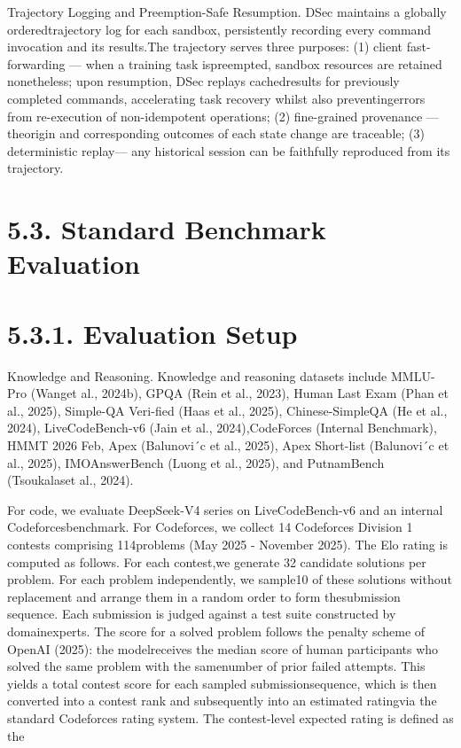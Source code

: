 \documentclass[
  10
]{article}
\newcounter{none} %
\begin{document}
Trajectory Logging and Preemption-Safe Resumption. DSec maintains a
globally orderedtrajectory log for each sandbox, persistently recording
every command invocation and its results.The trajectory serves three
purposes: (1) client fast-forwarding --- when a training task
ispreempted, sandbox resources are retained nonetheless; upon
resumption, DSec replays cachedresults for previously completed
commands, accelerating task recovery whilst also preventingerrors from
re-execution of non-idempotent operations; (2) fine-grained provenance
--- theorigin and corresponding outcomes of each state change are
traceable; (3) deterministic replay--- any historical session can be
faithfully reproduced from its trajectory.

\section{5.3. Standard Benchmark
Evaluation}\label{standard-benchmark-evaluation}

\section{5.3.1. Evaluation Setup}\label{evaluation-setup}

Knowledge and Reasoning. Knowledge and reasoning datasets include
MMLU-Pro (Wanget al., 2024b), GPQA (Rein et al., 2023), Human Last Exam
(Phan et al., 2025), Simple-QA Veri-fied (Haas et al., 2025),
Chinese-SimpleQA (He et al., 2024), LiveCodeBench-v6 (Jain et al.,
2024),CodeForces (Internal Benchmark), HMMT 2026 Feb, Apex (Balunovi´c
et al., 2025), Apex Short-list (Balunovi´c et al., 2025), IMOAnswerBench
(Luong et al., 2025), and PutnamBench (Tsoukalaset al., 2024).

For code, we evaluate DeepSeek-V4 series on LiveCodeBench-v6 and an
internal Codeforcesbenchmark. For Codeforces, we collect 14 Codeforces
Division 1 contests comprising 114problems (May 2025 - November 2025).
The Elo rating is computed as follows. For each contest,we generate 32
candidate solutions per problem. For each problem independently, we
sample10 of these solutions without replacement and arrange them in a
random order to form thesubmission sequence. Each submission is judged
against a test suite constructed by domainexperts. The score for a
solved problem follows the penalty scheme of OpenAI (2025): the
modelreceives the median score of human participants who solved the same
problem with the samenumber of prior failed attempts. This yields a
total contest score for each sampled submissionsequence, which is then
converted into a contest rank and subsequently into an estimated
ratingvia the standard Codeforces rating system. The contest-level
expected rating is defined as the
\end{document}
